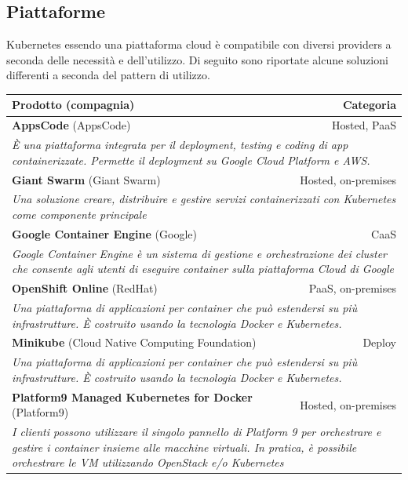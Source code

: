 \documentclass[12pt, a4paper]{report}
\begin{document}
\subsection{Piattaforme}
Kubernetes essendo una piattaforma cloud è compatibile con diversi providers a seconda delle necessità e dell'utilizzo. Di seguito sono riportate alcune soluzioni differenti a seconda del pattern di utilizzo.
\begin{table}[ht]
  \small
  \begin{center}
  \begin{tabularx}{\textwidth}{|lr|}
    \hline
    \textbf{Prodotto} (compagnia) & \textbf{Categoria}\\
    \hline
    \textbf{AppsCode} (AppsCode)&Hosted, PaaS\\
    \multicolumn{2}{|X|}{\textit{È una piattaforma integrata per il deployment, testing e coding di app containerizzate. Permette il deployment su Google Cloud Platform e AWS.}}\\
    \hline
    \textbf{Giant Swarm} (Giant Swarm)&Hosted, on-premises\\
    \multicolumn{2}{|X|}{\textit{Una soluzione creare, distribuire e gestire servizi containerizzati con Kubernetes come componente principale}}\\
    \hline
    \textbf{Google Container Engine} (Google)&CaaS\\
    \multicolumn{2}{|X|}{\textit{Google Container Engine è un sistema di gestione e orchestrazione dei cluster che consente agli utenti di eseguire container sulla piattaforma Cloud di Google}}\\
    \hline
    \textbf{OpenShift Online} (RedHat)&PaaS, on-premises\\
    \multicolumn{2}{|X|}{\textit{Una piattaforma di applicazioni per container che può estendersi su più infrastrutture. È costruito usando la tecnologia Docker e Kubernetes.}}\\
    \hline
    \textbf{Minikube} (Cloud Native Computing Foundation)&Deploy\\
    \multicolumn{2}{|X|}{\textit{Una piattaforma di applicazioni per container che può estendersi su più infrastrutture. È costruito usando la tecnologia Docker e Kubernetes.}}\\
    \hline
    \textbf{Platform9 Managed Kubernetes for Docker} (Platform9)&Hosted, on-premises\\
    \multicolumn{2}{|X|}{\textit{I clienti possono utilizzare il singolo pannello di Platform 9 per orchestrare e gestire i container insieme alle macchine virtuali. In pratica, è possibile orchestrare le VM utilizzando OpenStack e/o Kubernetes}}\\

\end{tabularx}
\end{center}
\end{table}
\end{document}
